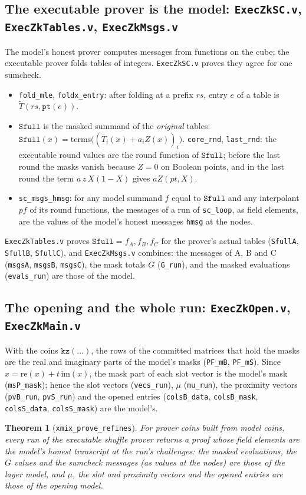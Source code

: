 \documentclass[11pt,a4paper]{article}
\newcommand{\mle}[1]{\widetilde{#1}}
\theoremstyle{definition}
\theoremstyle{plain}
\newtheorem{theorem}[definition]{Theorem}
\begin{document}
\subsection{The executable prover is the model: \texttt{ExecZkSC.v}, \texttt{ExecZkTables.v}, \texttt{ExecZkMsgs.v}}

The model's honest prover computes messages from functions on the cube; the executable prover folds
tables of integers. \texttt{ExecZkSC.v} proves they agree for one sumcheck.
\begin{itemize}[leftmargin=1.3em]
\item \texttt{fold\_mle}, \texttt{foldx\_entry}: after folding at a prefix $rs$, entry $e$ of a table is
  $\mle T(rs,\mathtt{pt}(e))$.
\item $\mathtt{Sfull}$ is the masked summand of the \emph{original} tables:
  $\mathtt{Sfull}(x)=\text{terms}\bigl((\mle{T_i}(x)+a_iZ(x))_i\bigr)$. \texttt{core\_rnd},
  \texttt{last\_rnd}: the executable round values are the round function of $\mathtt{Sfull}$; before the
  last round the masks vanish because $Z=0$ on Boolean points, and in the last round the term
  $a\,z\,X(1-X)$ gives $aZ(pt,X)$.
\item \texttt{sc\_msgs\_hmsg}: for any model summand $f$ equal to $\mathtt{Sfull}$ and any interpolant
  $pf$ of its round functions, the messages of a run of \texttt{sc\_loop}, as field elements, are the
  values of the model's honest messages \texttt{hmsg} at the nodes.
\end{itemize}
\texttt{ExecZkTables.v} proves $\mathtt{Sfull}=f_A,f_B,f_C$ for the prover's actual tables
(\texttt{SfullA}, \texttt{SfullB}, \texttt{SfullC}), and \texttt{ExecZkMsgs.v} combines: the messages of A, B
and C (\texttt{msgsA}, \texttt{msgsB}, \texttt{msgsC}), the mask totals $G$ (\texttt{G\_run}), and the masked
evaluations (\texttt{evals\_run}) are those of the model.

\subsection{The opening and the whole run: \texttt{ExecZkOpen.v}, \texttt{ExecZkMain.v}}

With the coins $\mathtt{kz}(\dots)$, the rows of the committed matrices that hold the masks are the
real and imaginary parts of the model's masks (\texttt{PF\_mB}, \texttt{PF\_mS}). Since
$x=\mathrm{re}(x)+t\,\mathrm{im}(x)$, the mask part of each slot vector is the model's mask
(\texttt{msP\_mask}); hence the slot vectors (\texttt{vecs\_run}), $\mu$ (\texttt{mu\_run}), the proximity
vectors (\texttt{pvB\_run}, \texttt{pvS\_run}) and the opened entries (\texttt{colsB\_data},
\texttt{colsB\_mask}, \texttt{colsS\_data}, \texttt{colsS\_mask}) are the model's.
\begin{theorem}[\texttt{xmix\_prove\_refines}]
For prover coins built from model coins, every run of the executable shuffle prover returns a proof
whose field elements are the model's honest transcript at the run's challenges: the masked
evaluations, the $G$ values and the sumcheck messages (as values at the nodes) are those of the
layer model, and $\mu$, the slot and proximity vectors and the opened entries are those of the
opening model.
\end{theorem}
\end{document}

